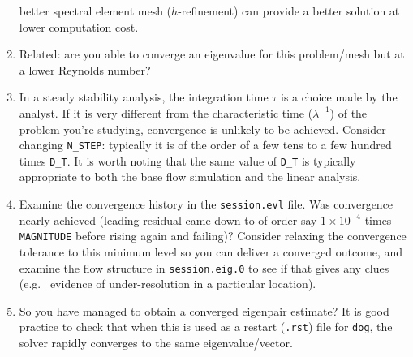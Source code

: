 \documentclass[11pt,a4paper]{report}
\newcommand{\eg}{e.g.\ }
\begin{document}
\begin{enumerate}
better spectral element mesh ($h$-refinement) can provide a better
solution at lower computation cost.
\item
Related: are you able to converge an eigenvalue for this problem/mesh
but at a lower Reynolds number?
\item
In a steady stability analysis, the integration time $\tau$ is a
choice made by the analyst.  If it is very different from the
characteristic time ($\lambda^{-1}$) of the problem you're studying,
convergence is unlikely to be achieved.  Consider changing
\verb+N_STEP+: typically it is of the order of a few tens to a few
hundred times \verb+D_T+. It is worth noting that the same value of
\verb+D_T+ is typically appropriate to both the base flow simulation
and the linear analysis.
\item
Examine the convergence history in the \verb+session.evl+ file.  Was
convergence nearly achieved (leading residual came down to of order
say $1\times10^{-4}$ times \verb+MAGNITUDE+ before rising again and
failing)?  Consider relaxing the convergence tolerance to this minimum
level so you can deliver a converged outcome, and examine the flow
structure in \verb+session.eig.0+ to see if that gives any clues (\eg
evidence of under-resolution in a particular location).
\item
So you have managed to obtain a converged eigenpair estimate?  It is
good practice to check that when this is used as a restart
(\verb+.rst+) file for \verb|dog|, the solver rapidly converges to the
same eigenvalue/vector.
\end{enumerate}




 

\end{document}
